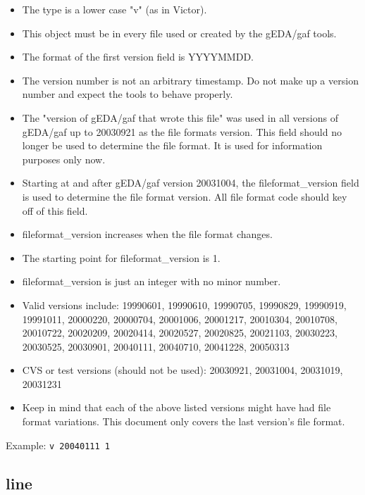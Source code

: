\documentclass{article}
\begin{document}
\begin{itemize}
\item The type is a lower case "v" (as in Victor).
\item This object must be in every file used or created by the gEDA/gaf tools.
\item The format of the first version field is YYYYMMDD.  
\item The version number is not an arbitrary timestamp.  Do not make up a 
      version number and expect the tools to behave properly.  
\item The "version of gEDA/gaf that wrote this file" was used in all versions of gEDA/gaf up to 20030921 as the file formats version.  This field should no longer be used to determine the file format.  It is used for information purposes only now. 
\item Starting at and after gEDA/gaf version 20031004, the fileformat\_version field is used to determine the file format version.  All file format code should key off of this field.
\item fileformat\_version increases when the file format changes.
\item The starting point for fileformat\_version is 1.
\item fileformat\_version is just an integer with no minor number.

\item Valid versions include: 
19990601, 19990610, 19990705, 19990829, 19990919, 19991011, 20000220, 20000704,
20001006, 20001217, 20010304, 20010708, 20010722, 20020209, 20020414, 20020527,
20020825, 20021103, 20030223, 20030525, 20030901, 20040111, 20040710, 20041228,
20050313

\item CVS or test versions (should not be used): 
20030921, 20031004, 20031019, 20031231

\item Keep in mind that each of the above listed versions might have had 
file format variations.  This document only covers the last version's file 
format.

\end{itemize}

Example: \newline
{\tt v 20040111 1}


\subsection{line}
\end{document}
